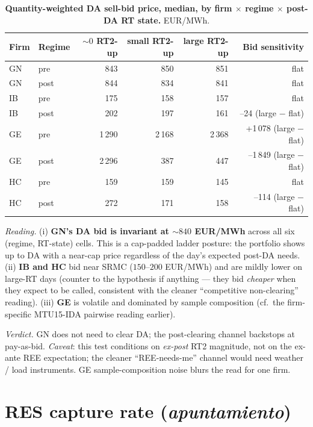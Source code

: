 \documentclass[11pt,a4paper]{article}
\begin{document}
\begin{table}[H]
\centering
\caption{\textbf{Quantity-weighted DA sell-bid price, median, by firm $\times$ regime $\times$ post-DA RT state.} EUR/MWh.}
\label{tab:bid_vs_rt2}
\begin{tabular}{l l r r r r}
\toprule
Firm & Regime & $\sim 0$ RT2-up & small RT2-up & large RT2-up & Bid sensitivity \\
\midrule
GN & pre  & 843 & 850 & 851 & flat \\
GN & post & 844 & 834 & 841 & flat \\
\addlinespace
IB & pre  & 175 & 158 & 157 & flat \\
IB & post & 202 & 197 & 161 & --24 (large $-$ flat) \\
\addlinespace
GE & pre  & 1\,290 & 2\,168 & 2\,368 & +1\,078 (large $-$ flat) \\
GE & post & 2\,296 & 387   & 447   & --1\,849 (large $-$ flat) \\
\addlinespace
HC & pre  & 159 & 159 & 145 & flat \\
HC & post & 272 & 171 & 158 & --114 (large $-$ flat) \\
\bottomrule
\end{tabular}
\end{table}

\textit{Reading.} (i) \textbf{GN's DA bid is invariant at $\sim 840$ EUR/MWh} across all six (regime, RT-state) cells. This is a cap-padded ladder posture: the portfolio shows up to DA with a near-cap price regardless of the day's expected post-DA needs. (ii) \textbf{IB and HC} bid near SRMC ($150$--$200$ EUR/MWh) and are mildly lower on large-RT days (counter to the hypothesis if anything --- they bid \emph{cheaper} when they expect to be called, consistent with the cleaner ``competitive non-clearing'' reading). (iii) \textbf{GE} is volatile and dominated by sample composition (cf.\ the firm-specific MTU15-IDA pairwise reading earlier).

\textit{Verdict.} GN does not need to clear DA; the post-clearing channel backstops at pay-as-bid. \emph{Caveat}: this test conditions on \emph{ex-post} RT2 magnitude, not on the ex-ante REE expectation; the cleaner ``REE-needs-me'' channel would need weather / load instruments. GE sample-composition noise blurs the read for one firm.


\section{RES capture rate (\emph{apuntamiento})}\label{sec:prov:apuntamiento}
\end{document}

